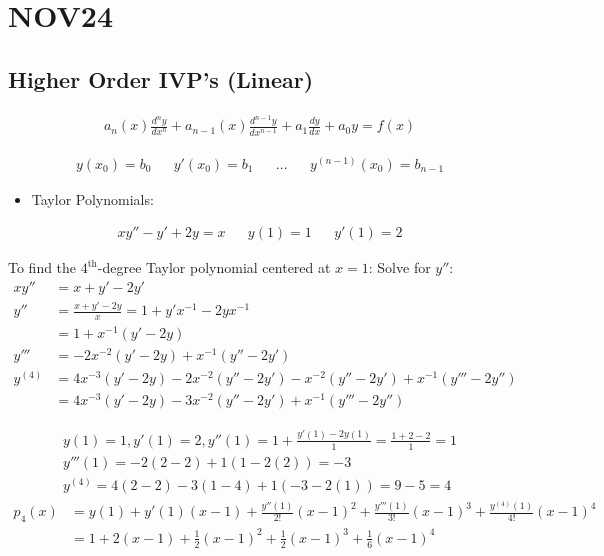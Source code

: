 \section{NOV24}
	\subsection{Higher Order IVP's (Linear)}
		\begin{align}
			a_{n}(x) \frac{d^{n}y}{dx^{n}} + a_{n-1}(x) \frac{d^{n-1}y}{dx^{n-1}} + a_{1}\frac{dy}{dx} + a_{0}y = f(x)
		\end{align}

		\begin{align}
			&y(x_{0}) = b_{0}&
			&y'(x_{0}) = b_{1}&
			&\dots&
			&y^{(n-1)}(x_{0}) = b_{n-1}&
		\end{align}

		\begin{itemize}
			\item{Taylor Polynomials:}
		\end{itemize}

		\begin{align}
			&xy'' - y' + 2y = x&
			&y(1) = 1&
			&y'(1)= 2&
		\end{align}

		To find the $4^{\text{th}}$-degree Taylor polynomial centered at $x=1$:
		Solve for $y''$:
		\begin{align}
			xy'' &= x + y' -2y'& \\
			y'' &= \frac{x+y'-2y}{x} = 1 + y'x^{-1} -2yx^{-1}& \\
			&= 1 + x^{-1}(y'-2y)& \\
			y''' &= -2x^{-2}(y'-2y) + x^{-1}(y''-2y')& \\
			y^{(4)} &= 4x^{-3}(y'-2y) - 2x^{-2}(y''-2y') - x^{-2}(y''-2y') + x^{-1}(y''' - 2y'')& \\
			&= 4x^{-3}(y'-2y) - 3x^{-2}(y''-2y') + x^{-1}(y''' - 2y'')&
		\end{align}

		\begin{align}
			y(1) = 1, y'(1) = 2, y''(1) = 1 + \frac{y'(1)-2y(1)}{1} = \frac{1+2-2}{1}=1 \\
			y'''(1) = -2(2-2) + 1(1-2(2)) = -3 \\
			y^{(4)} = 4(2 - 2) - 3(1-4) + 1(-3-2(1)) = 9 - 5 = 4
		\end{align}
		\begin{align}
			p_{4}(x) &= y(1) + y'(1)(x-1) + \frac{y''(1)}{2!}(x-1)^{2} + \frac{y'''(1)}{3!}(x-1)^{3}  + \frac{y^{(4)}(1)}{4!}(x-1)^{4}& \\
			&= 1 + 2(x-1) + \frac{1}{2}(x-1)^{2} + \frac{1}{2}(x-1)^{3}  + \frac{1}{6}(x-1)^{4}&
		\end{align}

